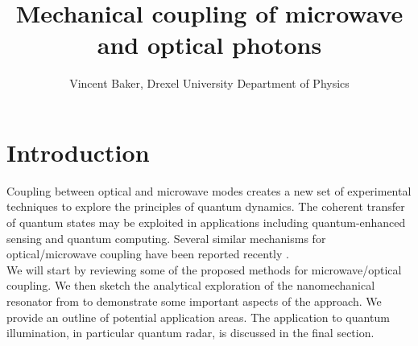 \documentclass[a4paper,11pt, twocolumn]{article}
\title{Mechanical coupling of microwave and optical photons}
\author{Vincent Baker, Drexel University Department of Physics}
\numberwithin{equation}{section}
\begin{document}
\section{Introduction}
Coupling between optical and microwave modes creates a new set of experimental techniques to explore the principles of quantum dynamics.
The coherent transfer of quantum states may be exploited in applications including quantum-enhanced sensing and quantum computing.
Several similar mechanisms for optical/microwave coupling have been reported recently \cite{nanoCrystal, nanoMR}.\\
We will start by reviewing some of the proposed methods for microwave/optical coupling.
We then sketch the analytical exploration of the nanomechanical resonator from \cite{nanoMR} to demonstrate some important aspects of the approach. 
We provide an outline of potential application areas.
The application to quantum illumination, in particular quantum radar, is discussed in the final section.
\end{document}
